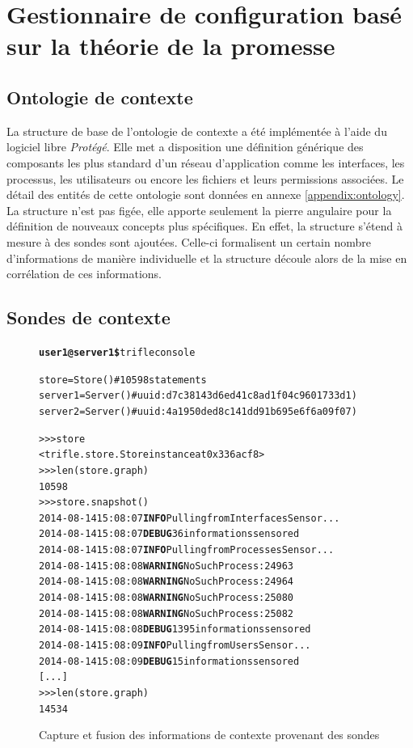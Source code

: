 \section{Gestionnaire de configuration basé sur la théorie de la promesse}

\subsection{Ontologie de contexte}

La structure de base de l'ontologie de contexte a été implémentée à l'aide du
logiciel libre \emph{Protégé}. Elle met a disposition une définition générique
des composants les plus standard d'un réseau d'application comme les interfaces,
les processus, les utilisateurs ou encore les fichiers et leurs permissions
associées. Le détail des entités de cette ontologie sont données en
annexe \ref{appendix:ontology}. La structure n'est pas figée, elle apporte
seulement la pierre angulaire pour la définition de nouveaux concepts plus
spécifiques. En effet, la structure s'étend à mesure à des sondes sont ajoutées.
Celle-ci formalisent un certain nombre d'informations de manière individuelle et
la structure découle alors de la mise en corrélation de ces informations.

\subsection{Sondes de contexte}

\begin{figure}
  \begin{alltt}\scriptsize
    \textbf{user1@server1\$} trifle console

    store   = Store()  # 10598 statements
    server1 = Server() # uuid: d7c38143d6ed41c8ad1f04c9601733d1)
    server2 = Server() # uuid: 4a1950ded8c141dd91b695e6f6a09f07)
    
    >>> store
    <trifle.store.Store instance at 0x336acf8>
    >>> len(store.graph)
    10598
    >>> store.snapshot()
    2014-08-14 15:08:07 \textbf{INFO} Pulling from InterfacesSensor...
    2014-08-14 15:08:07 \textbf{DEBUG} 36 informations sensored
    2014-08-14 15:08:07 \textbf{INFO} Pulling from ProcessesSensor...
    2014-08-14 15:08:08 \textbf{WARNING} NoSuchProcess: 24963
    2014-08-14 15:08:08 \textbf{WARNING} NoSuchProcess: 24964
    2014-08-14 15:08:08 \textbf{WARNING} NoSuchProcess: 25080
    2014-08-14 15:08:08 \textbf{WARNING} NoSuchProcess: 25082
    2014-08-14 15:08:08 \textbf{DEBUG} 1395 informations sensored
    2014-08-14 15:08:09 \textbf{INFO} Pulling from UsersSensor...
    2014-08-14 15:08:09 \textbf{DEBUG} 15 informations sensored
    [...]
    >>> len(store.graph)
    14534
  \end{alltt}
  \caption{Capture et fusion des informations de contexte provenant des sondes}
  \label{fig:sensor}
\end{figure}

